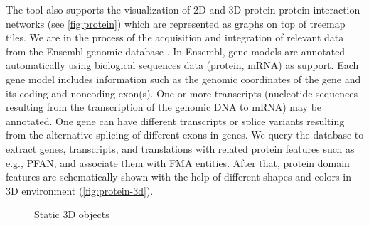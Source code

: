 The tool also supports the visualization of 2D and 3D protein-protein interaction networks (see \cref{fig:protein}) which are represented as graphs on top of treemap tiles. We are in the process of the acquisition and integration of relevant data from the Ensembl genomic database . In Ensembl, gene models are annotated automatically using biological sequences data (protein, mRNA) as support. Each gene model includes information such as the genomic coordinates of the gene and its coding and noncoding exon(s). One or more transcripts (nucleotide sequences resulting from the transcription of the genomic DNA to mRNA) may be annotated. One gene can have different transcripts or splice variants resulting from the alternative splicing of different exons in genes. We query the database to extract genes, transcripts, and translations with related protein features such as e.g., PFAN, and associate them with FMA entities. After that, protein domain features are schematically shown with the help of different shapes and colors in 3D environment (\cref{fig:protein-3d}).

\begin{figure}
\centering
  \caption{Static 3D objects}
  \label{fig:neurons}
\end{figure}

